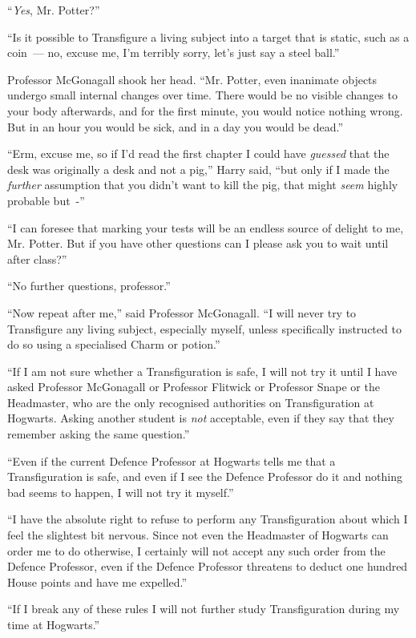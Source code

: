 ``\emph{Yes}, Mr. Potter?''

``Is it possible to Transfigure a living subject into a target that is static, such as a coin~--- no, excuse me, I'm terribly sorry, let's just say a steel ball.''

Professor McGonagall shook her head. ``Mr. Potter, even inanimate objects undergo small internal changes over time. There would be no visible changes to your body afterwards, and for the first minute, you would notice nothing wrong. But in an hour you would be sick, and in a day you would be dead.''

``Erm, excuse me, so if I'd read the first chapter I could have \emph{guessed} that the desk was originally a desk and not a pig,'' Harry said, ``but only if I made the \emph{further} assumption that you didn't want to kill the pig, that might \emph{seem} highly probable but~-''

``I can foresee that marking your tests will be an endless source of delight to me, Mr. Potter. But if you have other questions can I please ask you to wait until after class?''

``No further questions, professor.''

``Now repeat after me,'' said Professor McGonagall. ``I will never try to Transfigure any living subject, especially myself, unless specifically instructed to do so using a specialised Charm or potion.''

``If I am not sure whether a Transfiguration is safe, I will not try it until I have asked Professor McGonagall or Professor Flitwick or Professor Snape or the Headmaster, who are the only recognised authorities on Transfiguration at Hogwarts. Asking another student is \emph{not} acceptable, even if they say that they remember asking the same question.''

``Even if the current Defence Professor at Hogwarts tells me that a Transfiguration is safe, and even if I see the Defence Professor do it and nothing bad seems to happen, I will not try it myself.''

``I have the absolute right to refuse to perform any Transfiguration about which I feel the slightest bit nervous. Since not even the Headmaster of Hogwarts can order me to do otherwise, I certainly will not accept any such order from the Defence Professor, even if the Defence Professor threatens to deduct one hundred House points and have me expelled.''

``If I break any of these rules I will not further study Transfiguration during my time at Hogwarts.''

